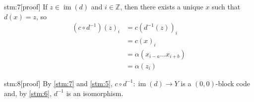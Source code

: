 \begin{stm}{stm:7}[proof]
If $z \in \operatorname{im}(d)$ and $i \in \mathbb{Z}$, then there exists a unique $x$ such that $d(x) = z$, so
\begin{align*}
(c \circ d^{-1})(z)_i &= c(d^{-1}(z))_i \\
&= c(x)_i \\
&= \alpha(x_{i-a} \ldots x_{i+b}) \\
&= \alpha(z_i)
\end{align*}
\end{stm}

\begin{stm}{stm:8}[proof]
By \ref{stm:7} and \ref{stm:5}, $c \circ d^{-1}: \operatorname{im}(d) \to Y$ is a $(0,0)$-block code and, by \ref{stm:6}, $d^{-1}$ is an isomorphism.
\end{stm}
